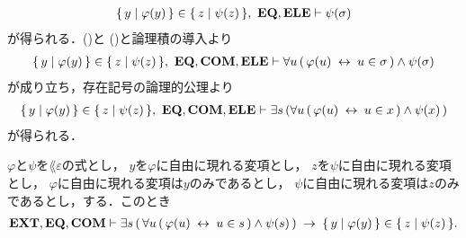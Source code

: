 \begin{sketch}
\begin{align}
			\{\, y \mid \varphi(y)\, \} \in \{\, z \mid \psi(z)\, \},\ \mbox{{\bf EQ}},\mbox{{\bf ELE}} \vdash 
			\psi(\sigma)
			\label{fom:equivalent_formula_rewriting_11_3}
		\end{align}
		が得られる．()と
		()と論理積の導入より
		\begin{align}
			\Set{y}{\varphi(y)} \in \Set{z}{\psi(z)},\ \EQAX,\COMAX,\ELEAX \vdash
			\forall u\, (\, \varphi(u) \lrarrow u \in \sigma\, ) \wedge \psi(\sigma)
		\end{align}
		が成り立ち，存在記号の論理的公理より
		\begin{align}
			\Set{y}{\varphi(y)} \in \Set{z}{\psi(z)},\ \EQAX,\COMAX,\ELEAX \vdash
			\exists s\, (\forall u\, (\, \varphi(u) \lrarrow u \in x\, ) \wedge \psi(x)\, )
		\end{align}
		が得られる．
		\QED
	\end{sketch}
	
	\begin{screen}
		\begin{thm}
		\label{thm:equivalent_formula_rewriting_12}
			$\varphi$と$\psi$を$\lang{\varepsilon}$の式とし，
			$y$を$\varphi$に自由に現れる変項とし，
			$z$を$\psi$に自由に現れる変項とし，
			$\varphi$に自由に現れる変項は$y$のみであるとし，
			$\psi$に自由に現れる変項は$z$のみであるとし，する．このとき
			\begin{align}
				\mbox{{\bf EXT}},\mbox{{\bf EQ}},\mbox{\bf COM} \vdash \exists s\, (\, \forall u\, (\, \varphi(u) \hspace{0.25em}\leftrightarrow\hspace{0.25em} u \in s\, ) \wedge \psi(s)\, ) \hspace{0.25em}\rightarrow\hspace{0.25em} \{\, y \mid \varphi(y)\, \} \in \{\, z \mid \psi(z)\, \}.
			\end{align}
		\end{thm}
	\end{screen}
	
